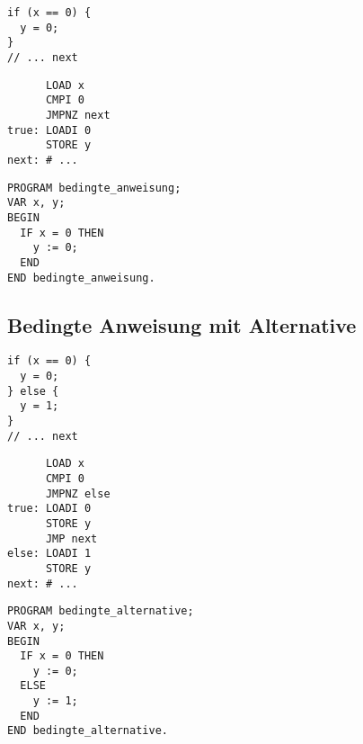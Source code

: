 \documentclass{lehramt-informatik-haupt}
\begin{document}
\begin{multicols}{3}
\begin{verbatim}
if (x == 0) {
  y = 0;
}
// ... next
\end{verbatim}

\columnbreak

\begin{verbatim}
      LOAD x
      CMPI 0
      JMPNZ next
true: LOADI 0
      STORE y
next: # ...
\end{verbatim}

\columnbreak

\begin{verbatim}
PROGRAM bedingte_anweisung;
VAR x, y;
BEGIN
  IF x = 0 THEN
    y := 0;
  END
END bedingte_anweisung.
\end{verbatim}

\end{multicols}

%

\subsection{Bedingte Anweisung mit Alternative}

\begin{multicols}{3}


\begin{verbatim}
if (x == 0) {
  y = 0;
} else {
  y = 1;
}
// ... next
\end{verbatim}

\vfill\strut\columnbreak


\begin{verbatim}
      LOAD x
      CMPI 0
      JMPNZ else
true: LOADI 0
      STORE y
      JMP next
else: LOADI 1
      STORE y
next: # ...
\end{verbatim}

\vfill\strut\columnbreak


\begin{verbatim}
PROGRAM bedingte_alternative;
VAR x, y;
BEGIN
  IF x = 0 THEN
    y := 0;
  ELSE
    y := 1;
  END
END bedingte_alternative.
\end{verbatim}

\end{multicols}

%
\end{document}
